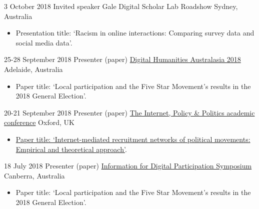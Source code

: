 \documentclass[12pt,a4paper,sans]{moderncv}
\begin{document}
  
    \cventry
      {3 October 2018} %
    {Invited speaker} %
    {Gale Digital Scholar Lab Roadshow} %
    {Sydney, Australia} %
  {}
    {
      \begin{itemize} %
        \item {Presentation title: `Racism in online interactions: Comparing survey data and social media data'.}
      \end{itemize}
    }

    \cventry
        {25-28 September 2018} %
    {Presenter (paper)} %
    {\href{http://dha-2018.p.dha2018.currinda.com/days/2018-09-28}{Digital Humanities Australasia 2018}} %
    {Adelaide, Australia} %
{}
    {
      \begin{itemize} %
        \item {Paper title: `Local participation and the Five Star Movement’s results in the 2018 General Election'.}
      \end{itemize}
    }


    \cventry
        {20-21 September 2018} %
    {Presenter (paper)} %
    {\href{http://blogs.oii.ox.ac.uk/policy/ipp-conference/papers/}{The Internet, Policy \& Politics academic conference}} %
    {Oxford, UK} %
{}
    {
      \begin{itemize} %
        \item {\href{http://blogs.oii.ox.ac.uk/policy/wp-content/uploads/sites/77/2018/09/IPP2018-Bailo.pdf}{Paper title: `Internet-mediated recruitment networks of political movements: Empirical and theoretical approach'}.}
      \end{itemize}
    }


    \cventry
        {18 July 2018} %
    {Presenter (paper)} %
    {\href{https://www.canberra.edu.au/research/faculty-research-centres/nmrc/news-and-events/events/digital-participation}{Information for Digital Participation Symposium}} %
    {Canberra, Australia} %
{}
    {
      \begin{itemize} %
        \item {Paper title: `Local participation and the Five Star Movement’s results in the 2018 General Election'.}
      \end{itemize}
    }
\end{document}
